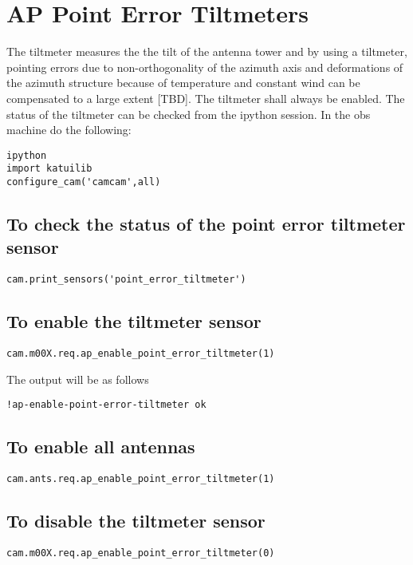 \section{ AP Point Error Tiltmeters}
The tiltmeter measures the the tilt of the antenna tower and by using a tiltmeter, pointing errors due to non-orthogonality of the azimuth axis and deformations of the azimuth structure because of temperature and constant wind can be compensated to a large extent [TBD]. The tiltmeter shall always be enabled.  The status of the tiltmeter can be checked from the ipython session. In the obs  machine do the following:
\begin{lstlisting}[style=DOS]
ipython
import katuilib
configure_cam('camcam',all)
\end{lstlisting}


\subsection{To check the status of the point error tiltmeter sensor}
\begin{lstlisting}[style=DOS]
cam.print_sensors('point_error_tiltmeter')
\end{lstlisting}


\subsection{To enable the tiltmeter sensor}
\begin{lstlisting}[style=DOS]
cam.m00X.req.ap_enable_point_error_tiltmeter(1)
\end{lstlisting}



The output will be as follows
\begin{lstlisting}[style=DOS]
!ap-enable-point-error-tiltmeter ok
\end{lstlisting}



\subsection{ To enable all antennas}
\begin{lstlisting}[style=DOS]
cam.ants.req.ap_enable_point_error_tiltmeter(1)
\end{lstlisting}



\subsection{To disable the tiltmeter sensor}
\begin{lstlisting}[style=DOS]
cam.m00X.req.ap_enable_point_error_tiltmeter(0)
\end{lstlisting}




